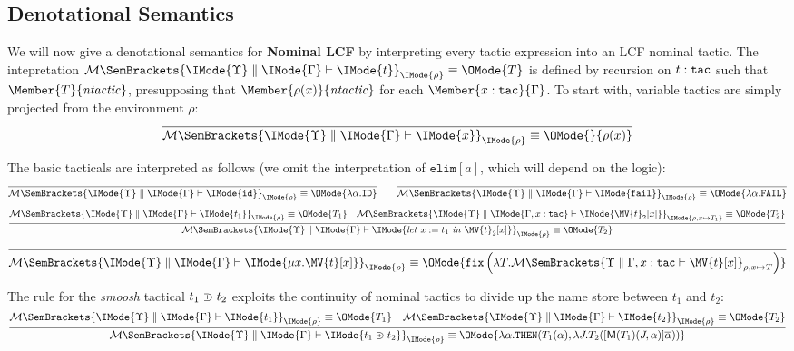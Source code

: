 \subsection{Denotational Semantics}

\newcommand\LCFElaboration[5]{%
  \mathcal{M}%
  \SemBrackets{
    #1\parallel #2\vdash%
    #3%
  }_{#5}%
}

\newcommand\LCFElab[6]{%
  \LCFElaboration{\IMode{#1}}{\IMode{#2}}{\IMode{#3}}{\IMode{#4}}{\IMode{#5}}%
  \equiv\OMode{#6}%
}

We will now give a denotational semantics for \textbf{Nominal LCF} by
interpreting every tactic expression into an LCF nominal tactic. The
intepretation $\LCFElab{\Upsilon}{\Gamma}{t}{\tau}{\rho}{T}$ is defined by
recursion on $t:\mathtt{tac}$ such that $\Member{T}{\LCFNominalTactic}$,
presupposing that $\Member{\rho(x)}{\LCFNominalTactic}$ for each
$\Member{x:\SortTac}{\Gamma}$.  To start with, variable tactics are simply
projected from the environment $\rho$:
\[
  \infer{
    \LCFElab{\Upsilon}{\Gamma}{x}{\SortTac}{\rho}{}{\rho(x)}
  }{
  }
\]

The basic tacticals are interpreted as follows (we omit the interpretation of
$\mathtt{elim}[a]$, which will depend on the logic):
\[
  \infer{
    \LCFElab{\Upsilon}{\Gamma}{\mathtt{id}}{\SortTac}{\rho}{
      \lambda\alpha.\mathtt{ID}
    }
  }{
  }
  \qquad
  \infer{
    \LCFElab{\Upsilon}{\Gamma}{\mathtt{fail}}{\SortTac}{\rho}{
      \lambda\alpha.\mathtt{FAIL}
    }
  }{
  }
\]
\[
  \infer{
    \LCFElab{\Upsilon}{\Gamma}{\TacLet{t_1}{x}{\MV{t}_2[x]}}{\SortTac}{\rho}{
      T_2
    }
  }{
    \LCFElab{\Upsilon}{\Gamma}{t_1}{\SortTac}{\rho}{T_1} &
    \LCFElab{\Upsilon}{\Gamma,x:\SortTac}{\MV{t}_2[x]}{\SortTac}{
      \rho,x\mapsto T_1
    }{
      T_2
    }
  }
\]
\[
  \infer{
    \LCFElab{\Upsilon}{\Gamma}{\TacFix{x}{\MV{t}[x]}}{\SortTac}{\rho}{
      \mathtt{fix}%
      \left(\lambda T.
        \LCFElaboration{\Upsilon}{\Gamma,x:\SortTac}{\MV{t}[x]}{\SortTac}{\rho,x\mapsto T}
      \right)
    }
  }{
  }
\]

The rule for the \emph{smoosh} tactical $t_1\supsetplus t_2$ exploits the
continuity of nominal tactics to divide up the name store between $t_1$ and $t_2$:
\[
  \infer{
    \LCFElab{\Upsilon}{\Gamma}{\TacSmoosh{t_1}{t_2}}{\SortTac}{\rho}{
      \lambda\alpha.\mathtt{THEN}(T_1(\alpha),\lambda J. T_2(\StreamChop{\alpha}{\ModC{T_1}(J,\alpha)}))
    }
  }{
    \LCFElab{\Upsilon}{\Gamma}{t_1}{\SortTac}{\rho}{T_1} &
    \LCFElab{\Upsilon}{\Gamma}{t_2}{\SortTac}{\rho}{T_2}
  }
\]

